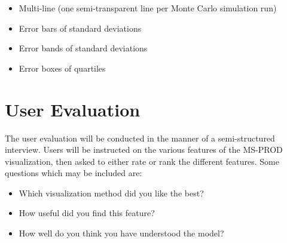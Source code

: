  \begin{itemize}
   \item Multi-line (one semi-transparent line per Monte Carlo simulation run)
   \item Error bars of standard deviations
   \item Error bands of standard deviations
   \item Error boxes of quartiles
 \end{itemize}

\section{User Evaluation}

The user evaluation will be conducted in the manner of a semi-structured interview.  Users will be instructed on the various features of the MS-PROD visualization, then asked to either rate or rank the different features.  Some questions which may be included are:

\begin{itemize}
  \item Which visualization method did you like the best?
  \item How useful did you find this feature?
  \item How well do you think you have understood the model?
\end{itemize}
